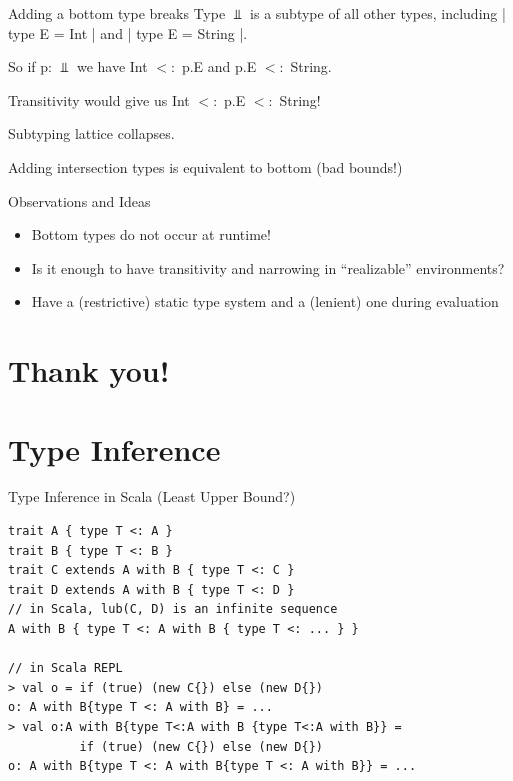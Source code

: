 \documentclass{beamer}
\begin{document}
\begin{frame}[fragile]{Adding a bottom type breaks}
Type $\Bot$ is a subtype of all other types, including |{ type E = Int }| 
and |{ type E = String }|.

So if p: $\Bot$ we have Int $<:$ p.E and p.E $<:$ String. 

Transitivity would give us Int $<:$ p.E $<:$ String!

Subtyping lattice collapses.

\vspace{1em}
Adding intersection types is equivalent to bottom (bad bounds!)

\end{frame}


\begin{frame}[fragile]{Observations and Ideas}
\begin{itemize}
\item Bottom types do not occur at runtime!
\item Is it enough to have transitivity and narrowing in ``realizable'' environments?
\item Have a (restrictive) static type system and a (lenient) one during evaluation
\end{itemize}
\end{frame}




\section{Thank you!}






\section{Type Inference}

\begin{frame}[fragile]{Type Inference in Scala (Least Upper Bound?)}
\begin{verbatim}
trait A { type T <: A }
trait B { type T <: B }
trait C extends A with B { type T <: C }
trait D extends A with B { type T <: D }
// in Scala, lub(C, D) is an infinite sequence
A with B { type T <: A with B { type T <: ... } }

// in Scala REPL
> val o = if (true) (new C{}) else (new D{})
o: A with B{type T <: A with B} = ...
> val o:A with B{type T<:A with B {type T<:A with B}} =
          if (true) (new C{}) else (new D{})
o: A with B{type T <: A with B{type T <: A with B}} = ...
\end{verbatim}
\end{frame}
\end{document}
